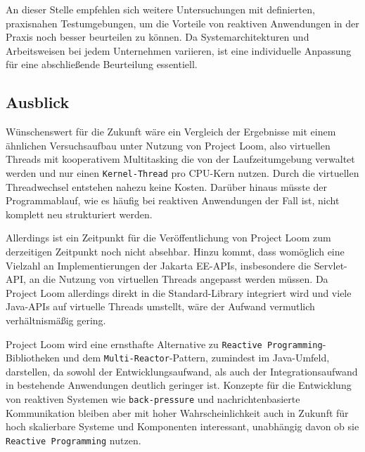 An dieser Stelle empfehlen sich weitere Untersuchungen mit definierten, praxisnahen Testumgebungen, um die Vorteile
von reaktiven Anwendungen in der Praxis noch besser beurteilen zu können.
Da Systemarchitekturen und Arbeitsweisen bei jedem Unternehmen variieren, ist eine individuelle Anpassung
für eine abschließende Beurteilung essentiell.

\subsection{Ausblick}
\label{subsec:ausblick}
Wünschenswert für die Zukunft wäre ein Vergleich der Ergebnisse mit einem ähnlichen Versuchsaufbau unter Nutzung von Project Loom,
also virtuellen Threads mit kooperativem Multitasking die von der Laufzeitumgebung verwaltet werden und nur einen \verb|Kernel-Thread| pro CPU-Kern nutzen.
Durch die virtuellen Threadwechsel entstehen nahezu keine Kosten. Darüber hinaus müsste der Programmablauf, wie es häufig bei reaktiven Anwendungen
der Fall ist, nicht komplett neu strukturiert werden.

Allerdings ist ein Zeitpunkt für die Veröffentlichung von Project Loom zum derzeitigen Zeitpunkt noch nicht absehbar.
Hinzu kommt, dass womöglich eine Vielzahl an Implementierungen der Jakarta EE-APIs, insbesondere die Servlet-API,
an die Nutzung von virtuellen Threads angepasst werden müssen. Da Project Loom allerdings direkt in die Standard-Library
integriert wird und viele Java-APIs auf virtuelle Threads umstellt, wäre der Aufwand vermutlich verhältnismäßig gering.

Project Loom wird eine ernsthafte Alternative zu \verb|Reactive Programming|-Bibliotheken und dem \verb|Multi-Reactor|-Pattern, zumindest
im Java-Umfeld, darstellen, da sowohl der Entwicklungsaufwand, als auch
der Integrationsaufwand in bestehende Anwendungen deutlich geringer ist.
Konzepte für die Entwicklung von reaktiven Systemen wie \verb|back-pressure| und nachrichtenbasierte Kommunikation bleiben aber mit hoher
Wahrscheinlichkeit auch in Zukunft für hoch skalierbare Systeme und Komponenten interessant, unabhängig davon ob sie \verb|Reactive Programming| nutzen.